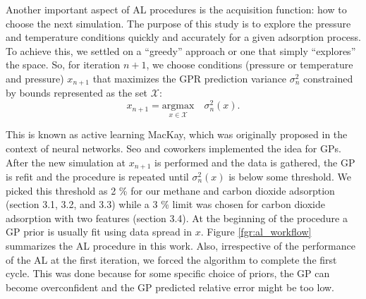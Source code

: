 \documentclass[twoside,twocolumn,9pt]{article}
\begin{document}
Another important aspect of AL procedures is the acquisition function: how to choose the next simulation. The purpose of this study is to explore the pressure and temperature conditions quickly and accurately for a given adsorption process. To achieve this, we settled on a “greedy” approach or one that simply “explores” the space. So, for iteration $n+1$, we choose conditions (pressure or temperature and pressure) $x_{n+1}$ that maximizes the GPR prediction variance $\sigma_n^2$ constrained by bounds represented as the set $\mathcal{X}$:
\begin{equation}
    x_{n+1} = \underset{x \in \mathcal{X}}{\text{argmax}} \quad \sigma_n^{2}(x).
\end{equation}

This is known as active learning MacKay, which was originally proposed in the context of neural networks.\cite{al_macay} Seo and coworkers implemented the idea for GPs.\cite{seo_gp} After the new simulation at $x_{n+1}$ is performed and the data is gathered, the GP is refit and the procedure is repeated until $\sigma_n^2\left(x\right)$ is below some threshold. We picked this threshold as 2 \% for our methane and carbon dioxide adsorption (section 3.1, 3.2, and 3.3) while a 3 \% limit was chosen for carbon dioxide adsorption with two features (section 3.4). At the beginning of the procedure a GP prior is usually fit using data spread in $x$. Figure \ref{fgr:al_workflow} summarizes the AL procedure in this work. Also, irrespective of the performance of the AL at the first iteration, we forced the algorithm to complete the first cycle. This was done because for some specific choice of priors, the GP can become overconfident and the GP predicted relative error might be too low.
\end{document}
